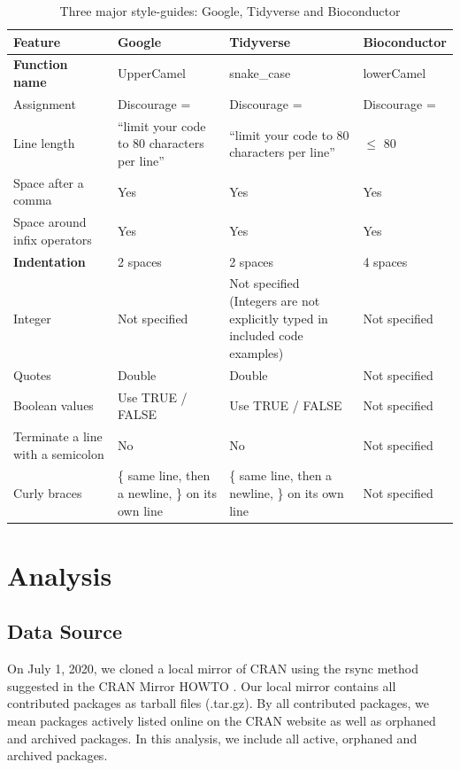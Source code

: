 \begin{table}

\caption{\label{tab:table1}Three major style-guides: Google, Tidyverse and Bioconductor}
\centering
\begin{tabular}[t]{L|L|L|L}
\hline
Feature & Google & Tidyverse & Bioconductor\\
\hline
\textbf{Function name} & UpperCamel & snake\_case & lowerCamel\\
\hline
Assignment & Discourage = & Discourage = & Discourage =\\
\hline
Line length & “limit your code to 80 characters per line” & “limit your code to 80 characters per line” & $\leqslant$ 80\\
\hline
Space after a comma & Yes & Yes & Yes\\
\hline
Space around infix operators & Yes & Yes & Yes\\
\hline
\textbf{Indentation} & 2 spaces & 2 spaces & 4 spaces\\
\hline
Integer & Not specified & Not specified (Integers are not explicitly typed in included code examples) & Not specified\\
\hline
Quotes & Double & Double & Not specified\\
\hline
Boolean values & Use TRUE / FALSE & Use TRUE / FALSE & Not specified\\
\hline
Terminate a line with a semicolon & No & No & Not specified\\
\hline
Curly braces & \{ same line, then a newline, \} on its own line & \{ same line, then a newline, \} on its own line & Not specified\\
\hline
\end{tabular}
\end{table}


\section{Analysis}
\subsection{Data Source}

On July 1, 2020, we cloned a local mirror of CRAN using the rsync method suggested in the CRAN Mirror HOWTO \citep{cranminihowto}. Our local mirror contains all contributed packages as tarball files (.tar.gz). By all contributed packages, we mean packages actively listed online on the CRAN website as well as orphaned and archived packages. In this analysis, we include all active, orphaned and archived packages.

